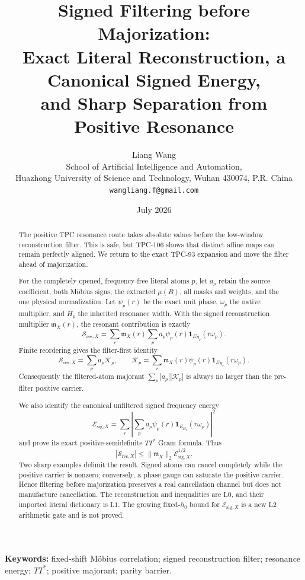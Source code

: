 \documentclass[11pt]{article}
\title{Signed Filtering before Majorization:\\
Exact Literal Reconstruction, a Canonical Signed Energy,\\
and Sharp Separation from Positive Resonance}
\author{Liang Wang\\
School of Artificial Intelligence and Automation,\\
Huazhong University of Science and Technology, Wuhan 430074, P.R. China\\
\texttt{wangliang.f@gmail.com}}
\date{July 2026}
\theoremstyle{remark}
\newcommand{\one}{\mathbf 1}
\newcommand{\Lzero}{\mathrm{L0}}
\newcommand{\Lone}{\mathrm{L1}}
\newcommand{\Ltwo}{\mathrm{L2}}
\begin{document}
\maketitle

\begin{abstract}
The positive TPC resonance route takes absolute values before the
low-window reconstruction filter.  This is safe, but TPC-106 shows
that distinct affine maps can remain perfectly aligned.  We return
to the exact TPC-93 expansion and move the filter ahead of
majorization.

For the completely opened, frequency-free literal atoms \(p\), let
\(a_p\) retain the source coefficient, both M\"obius signs, the
extracted \(\mu(B)\), all masks and weights, and the one physical
normalization.  Let \(\psi_p(r)\) be the exact unit phase,
\(\omega_p\) the native multiplier, and \(H_p\) the inherited
resonance width.  With the signed reconstruction multiplier
\(\mathfrak m_X(r)\), the resonant contribution is exactly
\[
 \mathcal S_{\mathrm{res},X}
 =
 \sum_r\mathfrak m_X(r)
 \sum_p a_p\psi_p(r)
 \one_{E_{H_p}}(r\omega_p).
\]
Finite reordering gives the filter-first identity
\[
 \mathcal S_{\mathrm{res},X}
 =
 \sum_pa_p\mathcal K_p,\qquad
 \mathcal K_p
 =
 \sum_r\mathfrak m_X(r)\psi_p(r)
 \one_{E_{H_p}}(r\omega_p).
\]
Consequently the filtered-atom majorant
\(\sum_p|a_p||\mathcal K_p|\) is always no larger than the
pre-filter positive carrier.

We also identify the canonical unfiltered signed frequency energy
\[
 \mathcal E_{\mathrm{sig},X}
 =
 \sum_r\left|
 \sum_pa_p\psi_p(r)\one_{E_{H_p}}(r\omega_p)
 \right|^2
\]
and prove its exact positive-semidefinite \(TT^*\) Gram formula.
Thus
\[
 |\mathcal S_{\mathrm{res},X}|
 \le\|\mathfrak m_X\|_2
 \mathcal E_{\mathrm{sig},X}^{1/2}.
\]
Two sharp examples delimit the result.  Signed atoms can cancel
completely while the positive carrier is nonzero; conversely, a
phase gauge can saturate the positive carrier.  Hence filtering
before majorization preserves a real cancellation channel but does
not manufacture cancellation.  The reconstruction and inequalities
are \(\Lzero\), and their imported literal dictionary is \(\Lone\).
The growing fixed-\(h_0\) bound for
\(\mathcal E_{\mathrm{sig},X}\) is a new \(\Ltwo\) arithmetic gate
and is not proved.
\end{abstract}

\noindent\textbf{Keywords:} fixed-shift M\"obius correlation;
signed reconstruction filter; resonance energy; \(TT^*\);
positive majorant; parity barrier.
\end{document}

